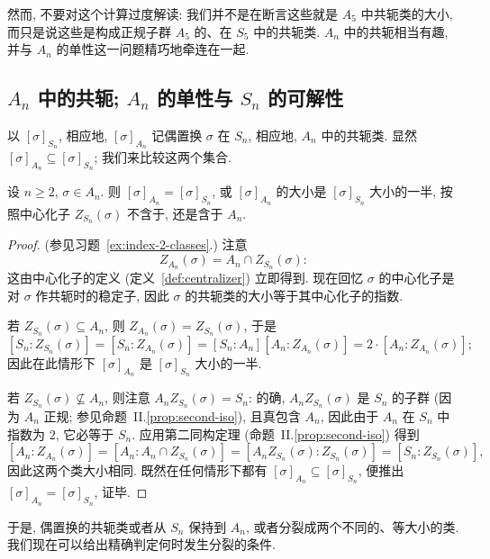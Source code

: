 然而, 不要对这个计算过度解读: 我们并不是在断言这些就是 $A_5$ 中共轭类的大小, 而只是说这些是构成正规子群 $A_5$ 的、在 $S_5$ 中的共轭类. $A_n$ 中的共轭相当有趣, 并与 $A_n$ 的单性这一问题精巧地牵连在一起.

\subsection{\texorpdfstring{$A_n$}{An} 中的共轭; \texorpdfstring{$A_n$}{An} 的单性与 \texorpdfstring{$S_n$}{Sn} 的可解性}
\label{subsec:an-simplicity}

以 $[\sigma]_{S_n}$, 相应地, $[\sigma]_{A_n}$ 记偶置换 $\sigma$ 在 $S_n$, 相应地, $A_n$ 中的共轭类. 显然 $[\sigma]_{A_n} \subseteq [\sigma]_{S_n}$; 我们来比较这两个集合.

\begin{lemma}
\label{lem:an-conjugacy-size}
设 $n \geq 2$, $\sigma \in A_n$. 则 $[\sigma]_{A_n} = [\sigma]_{S_n}$, 或 $[\sigma]_{A_n}$ 的大小是 $[\sigma]_{S_n}$ 大小的一半, 按照中心化子 $Z_{S_n}(\sigma)$ 不含于, 还是含于 $A_n$.
\end{lemma}

\begin{proof}
(参见习题~\ref{ex:index-2-classes}.) 注意
\[
Z_{A_n}(\sigma) = A_n \cap Z_{S_n}(\sigma):
\]
这由中心化子的定义 (定义~\ref{def:centralizer}) 立即得到. 现在回忆 $\sigma$ 的中心化子是对 $\sigma$ 作共轭时的稳定子, 因此 $\sigma$ 的共轭类的大小等于其中心化子的指数.

若 $Z_{S_n}(\sigma) \subseteq A_n$, 则 $Z_{A_n}(\sigma) = Z_{S_n}(\sigma)$, 于是
\[
[S_n : Z_{S_n}(\sigma)] = [S_n : Z_{A_n}(\sigma)] = [S_n : A_n][A_n : Z_{A_n}(\sigma)] = 2 \cdot [A_n : Z_{A_n}(\sigma)];
\]
因此在此情形下 $[\sigma]_{A_n}$ 是 $[\sigma]_{S_n}$ 大小的一半.

若 $Z_{S_n}(\sigma) \not\subseteq A_n$, 则注意 $A_n Z_{S_n}(\sigma) = S_n$: 的确, $A_n Z_{S_n}(\sigma)$ 是 $S_n$ 的子群 (因为 $A_n$ 正规; 参见命题~II.\ref{prop:second-iso}), 且真包含 $A_n$, 因此由于 $A_n$ 在 $S_n$ 中指数为 $2$, 它必等于 $S_n$. 应用第二同构定理 (命题~II.\ref{prop:second-iso}) 得到
\[
[A_n : Z_{A_n}(\sigma)] = [A_n : A_n \cap Z_{S_n}(\sigma)] = [A_n Z_{S_n}(\sigma) : Z_{S_n}(\sigma)] = [S_n : Z_{S_n}(\sigma)],
\]
因此这两个类大小相同. 既然在任何情形下都有 $[\sigma]_{A_n} \subseteq [\sigma]_{S_n}$, 便推出 $[\sigma]_{A_n} = [\sigma]_{S_n}$, 证毕.
\end{proof}

于是, 偶置换的共轭类或者从 $S_n$ 保持到 $A_n$, 或者分裂成两个不同的、等大小的类. 我们现在可以给出精确判定何时发生分裂的条件.

